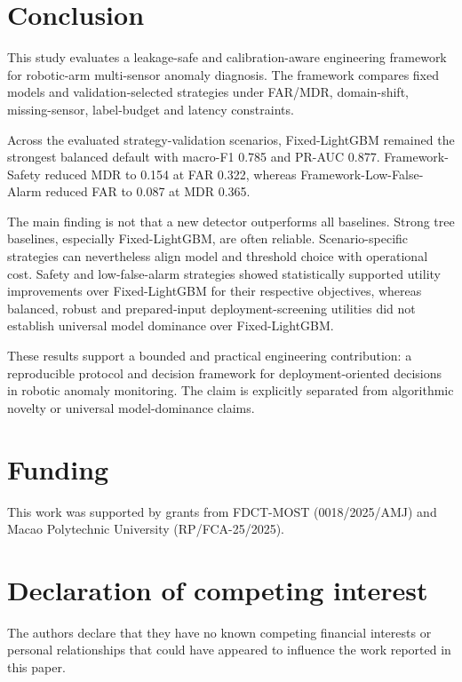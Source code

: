 \section{Conclusion}



This study evaluates a leakage-safe and calibration-aware engineering framework for robotic-arm multi-sensor anomaly diagnosis. The framework compares fixed models and validation-selected strategies under FAR/MDR, domain-shift, missing-sensor, label-budget and latency constraints.



Across the evaluated strategy-validation scenarios, Fixed-\allowbreak LightGBM remained the strongest balanced default with macro-F1 0.785 and PR-AUC 0.877. Framework-\allowbreak Safety reduced MDR to 0.154 at FAR 0.322, whereas Framework-\allowbreak Low-\allowbreak False-\allowbreak Alarm reduced FAR to 0.087 at MDR 0.365.

The main finding is not that a new detector outperforms all baselines. Strong tree baselines, especially Fixed-\allowbreak LightGBM, are often reliable. Scenario-specific strategies can nevertheless align model and threshold choice with operational cost. Safety and low-false-alarm strategies showed statistically supported utility improvements over Fixed-\allowbreak LightGBM for their respective objectives, whereas balanced, robust and prepared-input deployment-screening utilities did not establish universal model dominance over Fixed-\allowbreak LightGBM.



These results support a bounded and practical engineering contribution: a reproducible protocol and decision framework for deployment-oriented decisions in robotic anomaly monitoring. The claim is explicitly separated from algorithmic novelty or universal model-dominance claims.




\section*{Funding}
This work was supported by grants from FDCT-MOST (0018/2025/AMJ) and Macao Polytechnic University (RP/FCA-25/2025).

\section*{Declaration of competing interest}
The authors declare that they have no known competing financial interests or personal relationships that could have appeared to influence the work reported in this paper.

